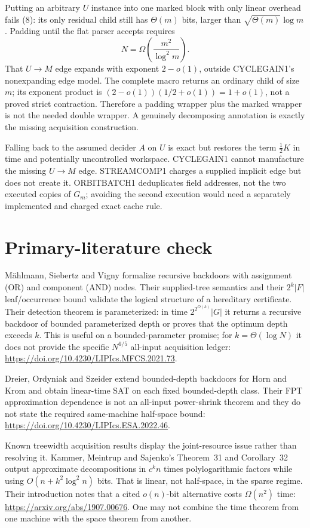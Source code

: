 \documentclass[11pt]{article}
\begin{document}
Putting an arbitrary $U$ instance into one marked block with only linear
overhead fails (8): its only residual child still has $\Theta(m)$ bits, larger
than $\sqrt{\Theta(m)}\log m$.  Padding until the flat parser accepts requires
\[
 N=\Omega\!\left(\frac{m^2}{\log^2m}\right).                \tag{9}
\]
That $U\to M$ edge expands with exponent $2-o(1)$, outside CYCLEGAIN1's
nonexpanding edge model.  The complete macro returns an ordinary child of
size $m$; its exponent product is $(2-o(1))(1/2+o(1))=1+o(1)$, not a proved
strict contraction.  Therefore a padding wrapper plus the marked wrapper is
not the needed double wrapper.  A genuinely decomposing annotation is exactly
the missing acquisition construction.

Falling back to the assumed decider $A$ on $U$ is exact but restores the term
$\tfrac12K$ in time and potentially uncontrolled workspace.  CYCLEGAIN1
cannot manufacture the missing $U\to M$ edge.  STREAMCOMP1 charges a supplied
implicit edge but does not create it.  ORBITBATCH1 deduplicates field addresses,
not the two executed copies of $G_m$; avoiding the second execution would need
a separately implemented and charged exact cache rule.

\section{Primary-literature check}
M\"ahlmann, Siebertz and Vigny formalize recursive backdoors with assignment
(OR) and component (AND) nodes.  Their supplied-tree semantics and their
$2^k|F|$ leaf/occurrence bound validate the logical structure of a hereditary
certificate.  Their detection theorem is parameterized: in time
$2^{2^{O(k)}}|G|$ it returns a recursive backdoor of bounded parameterized
depth or proves that the optimum depth exceeds $k$.  This is useful on a
bounded-parameter promise; for $k=\Theta(\log N)$ it does not provide the
specific $N^{6/5}$ all-input acquisition ledger:
\url{https://doi.org/10.4230/LIPIcs.MFCS.2021.73}.

Dreier, Ordyniak and Szeider extend bounded-depth backdoors for Horn and Krom
and obtain linear-time SAT on each fixed bounded-depth class.  Their FPT
approximation dependence is not an all-input power-shrink theorem and they do
not state the required same-machine half-space bound:
\url{https://doi.org/10.4230/LIPIcs.ESA.2022.46}.

Known treewidth acquisition results display the joint-resource issue rather
than resolving it.  Kammer, Meintrup and Sajenko's Theorem~31 and
Corollary~32 output approximate decompositions in $c^kn$ times polylogarithmic
factors while using $O(n+k^2\log^2n)$ bits.  That is linear, not half-space,
in the sparse regime.  Their introduction notes that a cited $o(n)$-bit
alternative costs $\Omega(n^2)$ time:
\url{https://arxiv.org/abs/1907.00676}.  One may not combine the time theorem
from one machine with the space theorem from another.
\end{document}
